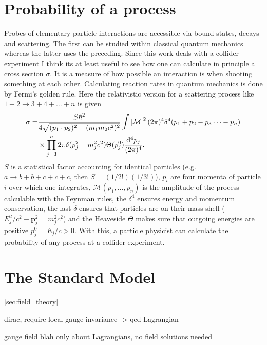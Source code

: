 \section{Probability of a process}
Probes of elementary particle interactions are accessible via bound states, decays and scattering. The first can be studied within classical quantum mechanics whereas the latter uses the preceding. Since this work deals with a collider experiment I think its at least useful to see how one can calculate in principle a cross section $\sigma$. It is a measure of how possible an interaction is when shooting something at each other. Calculating reaction rates in quantum mechanics is done by Fermi's golden rule. Here the relativistic version for a scattering process like $1+2 \rightarrow 3+4+\dots+n$ is given \citep{griffiths2020introduction}
\begin{align}
    \begin{split}
        \sigma=&\frac{S\hbar^2}{4\sqrt{(p_1\cdot p_2)^2 - (m_1m_2c^2)^2}}\int \left\vert\mathcal{M}\right\vert^2(2\pi)^4\delta^4(p_1+p_2-p_3 \dots-p_n) \\
        &\times \prod_{j=3}^n 2\pi \delta(p_j^2-m_j^2c^2)\Theta(p_j^0)\frac{\mathrm
        d^4p_j}{(2\pi)^4}.
    \end{split}
\end{align}
$S$ is a statistical factor accounting for identical particles (e.g. $a\rightarrow b+b+c+c+c$, then $S=(1/2!)(1/3!)$), $p_i$ are four momenta of particle $i$ over which one integrates, $\mathcal{M}(p_1,\dots,p_n)$ is the amplitude of the process calculable with the Feynman rules, the $\delta^4$ ensures energy and momentum conservation, the last $\delta$ ensures that particles are on their mass shell ($E_j^2/c^2-\bm{p}_j^2=m_j^2c^2$) and the Heaveside $\Theta$ makes sure that outgoing energies are positive $p_j^0=E_j/c>0$. With this, a particle physicist can calculate the probability of any process at a collider experiment.

\section{The Standard Model}
\ref{sec:field_theory}

dirac, require local gauge invariance -> qed Lagrangian


gauge field blah only about Lagrangians, no field solutions needed